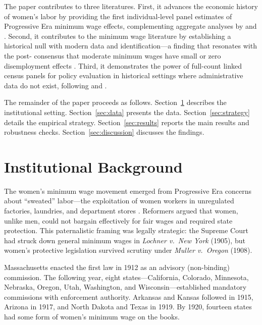 \documentclass[12pt]{article}
\begin{document}
The paper contributes to three literatures. First, it advances the economic history of women's labor by providing the first individual-level panel estimates of Progressive Era minimum wage effects, complementing aggregate analyses by \citet{goldin1990understanding} and \citet{seltzer2020}. Second, it contributes to the minimum wage literature by establishing a historical null with modern data and identification---a finding that resonates with the post-\citet{card1994minimum} consensus that moderate minimum wages have small or zero disemployment effects \citep{cengiz2019effect, dube2019minimum}. Third, it demonstrates the power of full-count linked census panels for policy evaluation in historical settings where administrative data do not exist, following \citet{abramitzky2012europe, abramitzky2014nation} and \citet{bailey2020howwell}.

The remainder of the paper proceeds as follows. Section~\ref{sec:background} describes the institutional setting. Section~\ref{sec:data} presents the data. Section~\ref{sec:strategy} details the empirical strategy. Section~\ref{sec:results} reports the main results and robustness checks. Section~\ref{sec:discussion} discusses the findings.

\section{Institutional Background}
\label{sec:background}

The women's minimum wage movement emerged from Progressive Era concerns about ``sweated'' labor---the exploitation of women workers in unregulated factories, laundries, and department stores \citep{sklar1995two}. Reformers argued that women, unlike men, could not bargain effectively for fair wages and required state protection. This paternalistic framing was legally strategic: the Supreme Court had struck down general minimum wages in \textit{Lochner v.\ New York} (1905), but women's protective legislation survived scrutiny under \textit{Muller v.\ Oregon} (1908).

Massachusetts enacted the first law in 1912 as an advisory (non-binding) commission. The following year, eight states---California, Colorado, Minnesota, Nebraska, Oregon, Utah, Washington, and Wisconsin---established mandatory commissions with enforcement authority. Arkansas and Kansas followed in 1915, Arizona in 1917, and North Dakota and Texas in 1919. By 1920, fourteen states had some form of women's minimum wage on the books.
\end{document}
